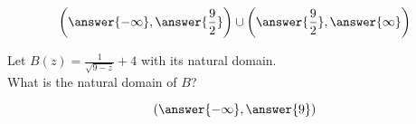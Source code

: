 \documentclass{ximera}
\begin{document}
\begin{exercise}
\begin{question}
\[
\left( \answer{-\infty}, \answer{\frac{9}{2}} \right) \cup \left( \answer{\frac{9}{2}}, \answer{\infty}  \right)
\]


\end{question}











\begin{question}


Let $B(z) = \frac{1}{\sqrt{9 - z}} + 4$ with its natural domain. \\

What is the natural domain of $B$?

\[
\left( \answer{-\infty}, \answer{9} \right) 
\]


\end{question}














\end{exercise}
\end{document}
